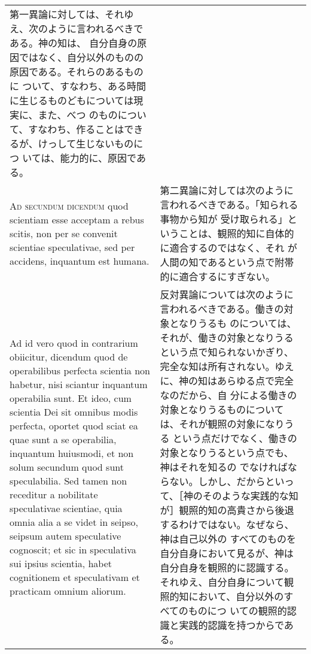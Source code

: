 \documentclass[10pt]{jsarticle} %
\begin{document}
\begin{longtable}{p{21em}p{21em}}
第一異論に対しては、それゆえ、次のように言われるべきである。神の知は、
自分自身の原因ではなく、自分以外のものの原因である。それらのあるものに
ついて、すなわち、ある時間に生じるものどもについては現実に、また、べつ
のものについて、すなわち、作ることはできるが、けっして生じないものにつ
いては、能力的に、原因である。


\\


{\scshape Ad secundum dicendum} quod scientiam esse acceptam a rebus
scitis, non per se convenit scientiae speculativae, sed per accidens,
inquantum est humana.

&

第二異論に対しては次のように言われるべきである。「知られる事物から知が
受け取られる」ということは、観照的知に自体的に適合するのではなく、それ
が人間の知であるという点で附帯的に適合するにすぎない。

\\


\hspace{1em}Ad id vero quod in contrarium obiicitur, dicendum quod de
operabilibus perfecta scientia non habetur, nisi sciantur inquantum
operabilia sunt. Et ideo, cum scientia Dei sit omnibus modis perfecta,
oportet quod sciat ea quae sunt a se operabilia, inquantum huiusmodi,
et non solum secundum quod sunt speculabilia. Sed tamen non receditur
a nobilitate speculativae scientiae, quia omnia alia a se videt in
seipso, seipsum autem speculative cognoscit; et sic in speculativa sui
ipsius scientia, habet cognitionem et speculativam et practicam omnium
aliorum.

&

反対異論については次のように言われるべきである。働きの対象となりうるも
のについては、それが、働きの対象となりうるという点で知られないかぎり、
完全な知は所有されない。ゆえに、神の知はあらゆる点で完全なのだから、自
分による働きの対象となりうるものについては、それが観照の対象になりうる
という点だけでなく、働きの対象となりうるという点でも、神はそれを知るの
でなければならない。しかし、だからといって、［神のそのような実践的な知
が］観照的知の高貴さから後退するわけではない。なぜなら、神は自己以外の
すべてのものを自分自身において見るが、神は自分自身を観照的に認識する。
それゆえ、自分自身について観照的知において、自分以外のすべてのものにつ
いての観照的認識と実践的認識を持つからである。




\end{longtable}
\newpage
\end{document}
